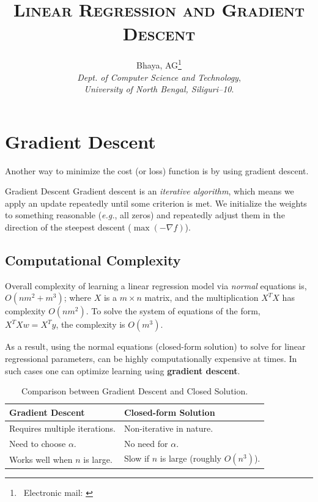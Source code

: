 \documentclass{article}
\title{\textbf{\scshape Linear Regression and Gradient Descent}}
\author{Bhaya, AG\thanks{\faEnvelope[regular]\ Electronic mail: \href{mailto:angubh.io@gmail.com}{\code{ananya[dot]gb[at]nbu[dot]ac[dot]in}}}\\\textsl{Dept. of Computer Science and Technology},\\
	\textsl{University of North Bengal, Siliguri--10}.}
\newcounter{solution}
\begin{document}
	\maketitle
	\pagebreak
	\tableofcontents
	\pagebreak
	
	\section{Gradient Descent}
	
	Another way to minimize the cost (or loss) function is by using gradient descent.
	
	\begin{definition}{Gradient Descent}
		Gradient descent is an \textit{iterative algorithm}, which means we apply an update repeatedly until some criterion is met. We initialize the weights to something reasonable (\textit{e.g.}, all zeros) and repeatedly adjust them in the direction of the steepest descent (\(\max (-\nabla f)\)).
	\end{definition}
	
	\subsection{Computational Complexity}
	
	Overall complexity of learning a linear regression model via \textit{normal} equations is, \(O(nm^2+m^3)\); where \(X\) is a \(m\times n\) matrix, and the multiplication \(X^TX\) has complexity \(O(nm^2)\). To solve the system of equations of the form, \(X^TXw=X^Ty\), the complexity is \(O(m^3)\).
	
	As a result, using the normal equations (closed-form solution) to solve for linear regressional parameters, can be highly computationally expensive at times. In such cases one can optimize learning using \textbf{gradient descent}.
	
	\begin{table}[ht]
		\centering
		\begin{tabularx}{1\textwidth}{|X|X|}
			\hline
			\textbf{Gradient Descent} & \textbf{Closed-form Solution} \\
			\hline
			\hline
			Requires multiple iterations. & Non-iterative in nature.\\
			\hline
			Need to choose \(\alpha\). & No need for \(\alpha\). \\
			\hline
			Works well when \(n\) is large. & Slow if \(n\) is large (roughly \(O(n^3)\)).\\
			\hline
		\end{tabularx}
		\caption{Comparison between Gradient Descent and Closed Solution.}
	\end{table}
\end{document}
